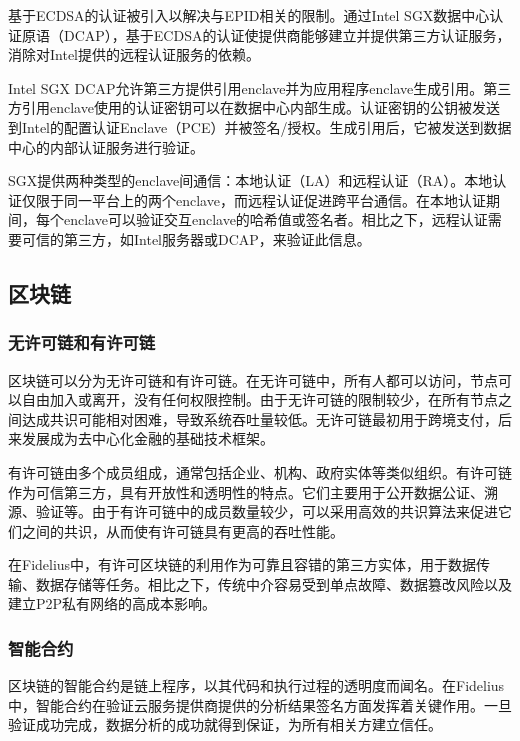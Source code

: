 基于ECDSA的认证被引入以解决与EPID相关的限制。通过Intel SGX数据中心认证原语（DCAP），基于ECDSA的认证使提供商能够建立并提供第三方认证服务，消除对Intel提供的远程认证服务的依赖。

Intel SGX DCAP允许第三方提供引用enclave并为应用程序enclave生成引用。第三方引用enclave使用的认证密钥可以在数据中心内部生成。认证密钥的公钥被发送到Intel的配置认证Enclave（PCE）并被签名/授权。生成引用后，它被发送到数据中心的内部认证服务进行验证。

SGX提供两种类型的enclave间通信：本地认证（LA）和远程认证（RA）。本地认证仅限于同一平台上的两个enclave，而远程认证促进跨平台通信。在本地认证期间，每个enclave可以验证交互enclave的哈希值或签名者。相比之下，远程认证需要可信的第三方，如Intel服务器或DCAP，来验证此信息。

\subsection{区块链}
\subsubsection{无许可链和有许可链}
区块链可以分为无许可链和有许可链。在无许可链中，所有人都可以访问，节点可以自由加入或离开，没有任何权限控制。由于无许可链的限制较少，在所有节点之间达成共识可能相对困难，导致系统吞吐量较低。无许可链最初用于跨境支付，后来发展成为去中心化金融的基础技术框架。

有许可链由多个成员组成，通常包括企业、机构、政府实体等类似组织。有许可链作为可信第三方，具有开放性和透明性的特点。它们主要用于公开数据公证、溯源、验证等。由于有许可链中的成员数量较少，可以采用高效的共识算法来促进它们之间的共识，从而使有许可链具有更高的吞吐性能。

在Fidelius中，有许可区块链的利用作为可靠且容错的第三方实体，用于数据传输、数据存储等任务。相比之下，传统中介容易受到单点故障、数据篡改风险以及建立P2P私有网络的高成本影响。

\subsubsection{智能合约}
区块链的智能合约是链上程序，以其代码和执行过程的透明度而闻名。在Fidelius中，智能合约在验证云服务提供商提供的分析结果签名方面发挥着关键作用。一旦验证成功完成，数据分析的成功就得到保证，为所有相关方建立信任。 